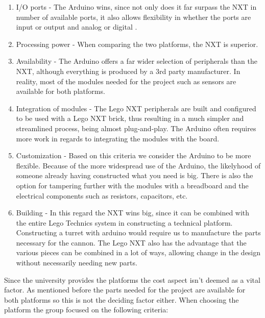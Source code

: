 \begin{enumerate}
  \item I/O ports - The Arduino wins, since not only does it far surpass
  the NXT in number of available ports, it also allows flexibility in
  whether the ports are input or output and analog or digital \Source.
  \item Processing power - When comparing the two platforms, the NXT is
  superior. 
  \item Availability - The Arduino offers a far wider selection of peripherals
  than the NXT, although everything is produced by a 3rd party manufacturer. In
  reality, most of the modules needed for the project such as sensors are
  available for both platforms.
  \item Integration of modules - The Lego NXT peripherals are built and
  configured to be used with a Lego NXT brick, thus resulting in a much simpler
  and streamlined process, being almost plug-and-play. The Arduino often
  requires more work in regards to integrating the modules with the board.
  \item Customization - Based on this criteria we consider the Arduino to be
  more flexible. Because of the more widespread use of the Arduino, the
  likelyhood of someone already having constructed what you need is big. There
  is also the option for tampering further with the modules with a breadboard
  and the electrical components such as resistors, capacitors, etc.
  \item Building - In this regard the NXT wins big, since it can be combined
  with the entire Lego Technics system in constructing a technical platform.
  Constructing a turret with arduino would require us to manufacture the parts
  necessary for the cannon. The Lego NXT also has the advantage that the various
  pieces can be combined in a lot of ways, allowing change in the design
  without necessarily needing new parts.
\end{enumerate}

Since the university provides the platforms the cost aspect isn't deemed as a
vital factor. As mentioned before the parts needed for the project are
available for both platforms so this is not the deciding factor either. When
choosing the platform the group focused on the following criteria:

